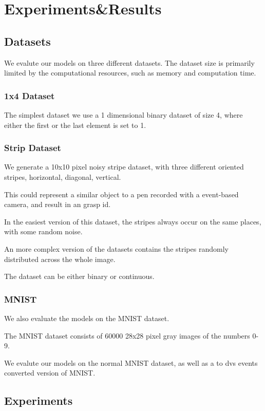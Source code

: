 \chapter{Experiments\&Results}

\section{Datasets}

We evalute our models on three different datasets.
The dataset size is primarily limited by the computational resources, such as memory and computation time. 

\subsection{1x4 Dataset}

The simplest dataset we use a 1 dimensional binary dataset of size 4, where either the first or the last element is set to 1. 

\subsection{Strip Dataset}

We generate a 10x10 pixel noisy stripe dataset, with three different oriented stripes, horizontal, diagonal, vertical. 

This could represent a similar object to a pen recorded with a event-based camera, and result in an grasp id.

In the easiest version of this dataset, the stripes always occur on the same places, with some random noise.

An more complex version of the datasets contains the stripes randomly distributed across the whole image.

The dataset can be either binary or continuous.

\subsection{MNIST}

We also evaluate the models on the MNIST dataset. 

The MNIST dataset consists of 60000 28x28 pixel gray images of the numbers 0-9.

We evalute our models on the normal MNIST dataset, as well as a to dvs events converted version of MNIST.

\section{Experiments}

